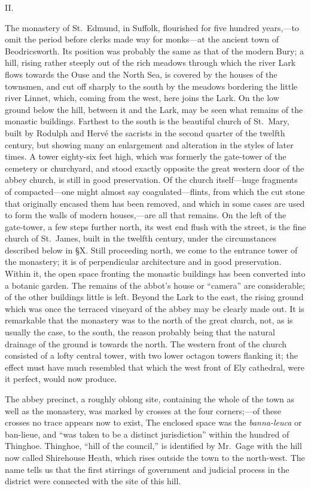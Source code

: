 \documentclass[10pt]{book}
\begin{document}
{\newpage
\begin{center}
II.
\end{center}
\noindent The monastery of St.\ Edmund, in Suffolk, flourished for five hundred years,---to omit the period before clerks made way for monks---at the ancient town of Beodricsworth. Its position was probably the same as that of the modern Bury; a hill, rising rather steeply out of the rich meadows through which the river Lark flows towards the Ouse and the North Sea, is covered by the houses of the townsmen, and cut off sharply to the south by the meadows bordering the little river Linnet, which, coming from the west, here joins the Lark. On the low ground below the hill, between it and the Lark, may be seen what remains of the monastic buildings. Farthest to the south is the beautiful church of St.\ Mary, built by Rodulph and Hervé the sacrists in the second quarter of the twelfth century, but showing many an enlargement and alteration in the styles of later times. A tower eighty-six feet high, which was formerly the gate-tower of the cemetery or churchyard, and stood exactly opposite the great western door of the abbey church, is still in good preservation. Of the church itself---huge fragments of compacted---one might almost say coagulated---flints, from which the cut stone that originally encased them has been removed, and which in some cases are used to form the walls of modern houses,---are all that remains. On the left of the gate-tower, a few steps further north, its west end flush with the street, is the fine church of St.\ James, built in the twelfth century, under the circumstances described below in \S{}X. Still proceeding north, we come to the entrance tower of the monastery; it is of perpendicular architecture and in good preservation. Within it, the open space fronting the monastic buildings has been converted into a botanic garden. The remains of the abbot's house or ``camera'' are considerable; of the other buildings little is left. Beyond the Lark to the east, the rising ground which was once the terraced vineyard of the abbey may be clearly made out. It is remarkable that the monastery was to the north of the great church, not, as is usually the case, to the south, the reason probably being that the natural drainage of the ground is towards the north. The western front of the church consisted of a lofty central tower, with two lower octagon towers flanking it; the effect must have much resembled that which the west front of Ely cathedral, were it perfect, would now produce.

The abbey precinct, a roughly oblong site, containing the whole of the town as well as the monastery, was marked by crosses at the four corners;---of these crosses no trace appears now to exist, The enclosed space was the \emph{banna-leuca} or ban-lieue, and ``was taken to be a distinct jurisdiction'' within the hundred of Thinghoe. Thinghoe, ``hill of the council,'' is identified by Mr.\ Gage with the hill now called Shirehouse Heath, which rises outside the town to the north-west. The name tells us that the first stirrings of government and judicial process in the district were connected with the site of this hill.

}
\end{document}
